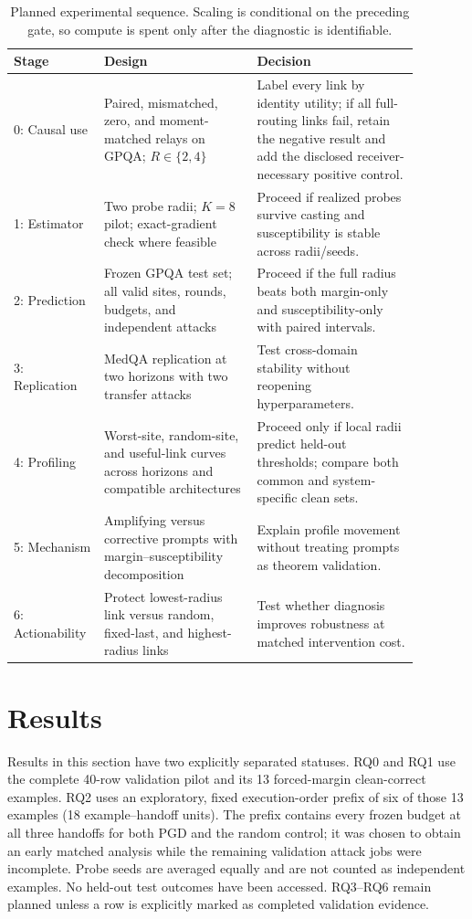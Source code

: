 \documentclass[11pt]{article}
\begin{document}
\begin{table}[t]
\centering
\small
\setlength{\tabcolsep}{3.6pt}
\caption{Planned experimental sequence. Scaling is conditional on the preceding
gate, so compute is spent only after the diagnostic is identifiable.}
\label{tab:experiment-sequence}
\begin{tabular}{p{0.16\linewidth}p{0.35\linewidth}p{0.37\linewidth}}
\toprule
\textbf{Stage} & \textbf{Design} & \textbf{Decision} \\
\midrule
0: Causal use &
Paired, mismatched, zero, and moment-matched relays on GPQA; $R\in\{2,4\}$ &
Label every link by identity utility; if all full-routing links fail, retain the
negative result and add the disclosed receiver-necessary positive control. \\
\midrule
1: Estimator &
Two probe radii; $K=8$ pilot; exact-gradient check where feasible &
Proceed if realized probes survive casting and susceptibility is stable across
radii/seeds. \\
\midrule
2: Prediction &
Frozen GPQA test set; all valid sites, rounds, budgets, and independent attacks &
Proceed if the full radius beats both margin-only and susceptibility-only with
paired intervals. \\
\midrule
3: Replication &
MedQA replication at two horizons with two transfer attacks &
Test cross-domain stability without reopening hyperparameters. \\
\midrule
4: Profiling &
Worst-site, random-site, and useful-link curves across horizons and compatible
architectures &
Proceed only if local radii predict held-out thresholds; compare both common
and system-specific clean sets. \\
\midrule
5: Mechanism &
Amplifying versus corrective prompts with margin--susceptibility decomposition &
Explain profile movement without treating prompts as theorem validation. \\
\midrule
6: Actionability &
Protect lowest-radius link versus random, fixed-last, and highest-radius links &
Test whether diagnosis improves robustness at matched intervention cost. \\
\bottomrule
\end{tabular}
\end{table}

\section{Results}
\label{sec:results}

Results in this section have two explicitly separated statuses. RQ0 and RQ1
use the complete 40-row validation pilot and its 13 forced-margin clean-correct
examples. RQ2 uses an exploratory, fixed execution-order prefix of six of those
13 examples (18 example--handoff units). The prefix contains every frozen
budget at all three handoffs for both PGD and the random control; it was chosen
to obtain an early matched analysis while the remaining validation attack jobs
were incomplete. Probe seeds are averaged equally and are not counted as
independent examples. No held-out test outcomes have been accessed. RQ3--RQ6
remain planned unless a row is explicitly marked as completed validation
evidence.
\end{document}
